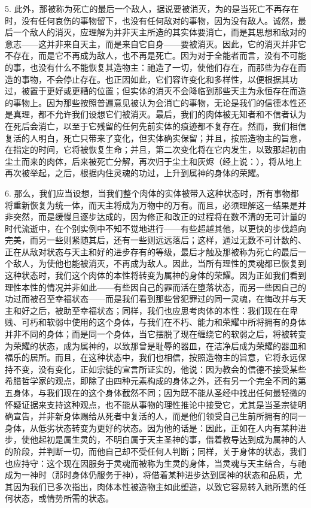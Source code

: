 5. 此外，那被称为死亡的最后一个敌人，据说要被消灭，为的是当死亡不再存在时，没有任何哀伤的事物留下，也没有任何敌对的事物，因为没有敌人。诚然，最后一个敌人的消灭，应理解为并非天主所造的其实体要消亡，而是其思想和敌对的意志——这并非来自天主，而是来自它自身——要被消灭。因此，它的消灭并非它不存在，而是它不再成为敌人，也不再是死亡。因为对于全能者而言，没有不可能的事，也没有什么不能恢复其造物主：祂造了一切，使他们存在，而那些为存在而造的事物，不会停止存在。也正因如此，它们容许变化和多样性，以便根据其功过，被置于更好或更糟的位置；但实体的消灭不会降临到那些天主为永恒存在而造的事物上。因为那些按照普遍意见被认为会消亡的事物，无论是我们的信德本性还是真理，都不允许我们设想它们被消灭。最后，我们的肉体被无知者和不信者认为在死后会消亡，以至于它残留的任何先前实体的痕迹都不复存在。然而，我们相信复活的人明白，死亡只带来了变化，但实体确实保留；并且，按照造物主的旨意，在指定的时间，它将被恢复生命；并且，第二次变化将在它内发生，以致那起初由尘土而来的肉体，后来被死亡分解，再次归于尘土和灰烬（经上说：），将从地上再次被举起，之后，根据内住灵魂的功过，上升到属神的身体的荣耀。\par

6. 那么，我们应当设想，当我们整个肉体的实体被带入这种状态时，所有事物都将重新恢复为统一体，而天主将成为万物中的万有。而且，必须理解这一结果是并非突然，而是缓慢且逐步达成的，因为修正和改正的过程将在数不清的无可计量的时代流逝中，在个别实例中不知不觉地进行——有些超越其他，以更快的步伐趋向完美，而另一些则紧随其后，还有一些则远远落后；这样，通过无数不可计数的、正在从敌对状态与天主和好的进步存有的等级，最后才触及那被称为死亡的最后一个敌人，为使他也能被消灭，不再成为敌人。因此，当所有理性的灵魂都已恢复到这种状态时，我们这个肉体的本性将转变为属神的身体的荣耀。因为正如我们看到理性本性的情况并非如此——有些因自己的罪而活在堕落状态，而另一些因自己的功过而被召至幸福状态——而是我们看到那些曾犯罪过的同一灵魂，在悔改并与天主和好之后，被助至幸福状态；同样，我们也应思考肉体的本性：我们现在在卑贱、可朽和软弱中使用的这个身体，与我们在不朽、能力和荣耀中所将拥有的身体并非不同的身体；而是同一个身体，当它摆脱了现在缠绕它的软弱之后，将被转变为荣耀的状态，成为属神的，以致那曾是耻辱的器皿，在洁净后成为荣耀的器皿和福乐的居所。而且，在这种状态中，我们也相信，按照造物主的旨意，它将永远保持不变，没有变化，正如宗徒的宣言所证实的，他说：因为教会的信德不接受某些希腊哲学家的观点，即除了由四种元素构成的身体之外，还有另一个完全不同的第五身体，与我们现在的这个身体截然不同；因为既不能从圣经中找出任何最轻微的怀疑证据来支持这种观点，也不能从事物的理性推论中接受它，尤其是当圣宗徒明确宣告，并非新身体赐给从死者中复活的人，而是他们领受自己生前所拥有的同一身体，从低劣状态转变为更好的状态。因为他的话是：因此，正如在人内有某种进步，使他起初是属生灵的，不明白属于天主圣神的事，借着教导达到成为属神的人的阶段，并判断一切，而他自己却不受任何人判断；同样，关于身体的状态，我们也应持守：这个现在因服务于灵魂而被称为生灵的身体，当灵魂与天主结合，与祂成为一神时（那时身体仍服务于神），将借着某种进步达到属神的状态和品质，尤其因为我们已多次指出，肉体本性被造物主如此塑造，以致它容易转入祂所愿的任何状态，或情势所需的状态。\par

